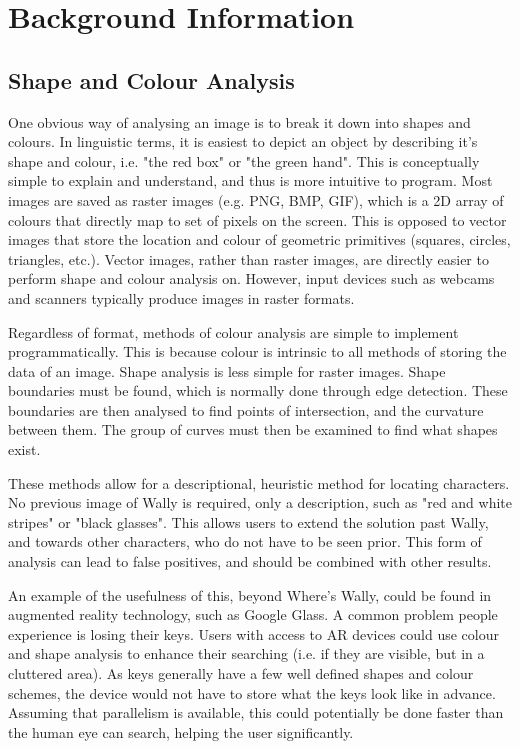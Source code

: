 \documentclass[../main.tex]{subfiles}
\begin{document}
  \section{Background Information}
    \subsection{Shape and Colour Analysis}
    One obvious way of analysing an image is to break it down into shapes and colours.
    In linguistic terms, it is easiest to depict an object by describing it's shape and colour, i.e. "the red box" or "the green hand".
    This is conceptually simple to explain and understand, and thus is more intuitive to program.
    Most images are saved as raster images (e.g. PNG, BMP, GIF), which is a 2D array of colours that directly map to set of pixels on the screen.
    This is opposed to vector images that store the location and colour of geometric primitives (squares, circles, triangles, etc.).
    Vector images, rather than raster images, are directly easier to perform shape and colour analysis on.
    However, input devices such as webcams and scanners typically produce images in raster formats.

    Regardless of format, methods of colour analysis are simple to implement programmatically.
    This is because colour is intrinsic to all methods of storing the data of an image.
    Shape analysis is less simple for raster images.
    Shape boundaries must be found, which is normally done through edge detection.
    These boundaries are then analysed to find points of intersection, and the curvature between them.
    The group of curves must then be examined to find what shapes exist.

    These methods allow for a descriptional, heuristic method for locating characters.
    No previous image of Wally is required, only a description, such as "red and white stripes" or "black glasses".
    This allows users to extend the solution past Wally, and towards other characters, who do not have to be seen prior.
    This form of analysis can lead to false positives, and should be combined with other results.

    An example of the usefulness of this, beyond Where's Wally, could be found in augmented reality technology, such as Google Glass.
    A common problem people experience is losing their keys.
    Users with access to AR devices could use colour and shape analysis to enhance their searching (i.e. if they are visible, but in a cluttered area).
    As keys generally have a few well defined shapes and colour schemes, the device would not have to store what the keys look like in advance.
    Assuming that parallelism is available, this could potentially be done faster than the human eye can search, helping the user significantly.
    
\end{document}
